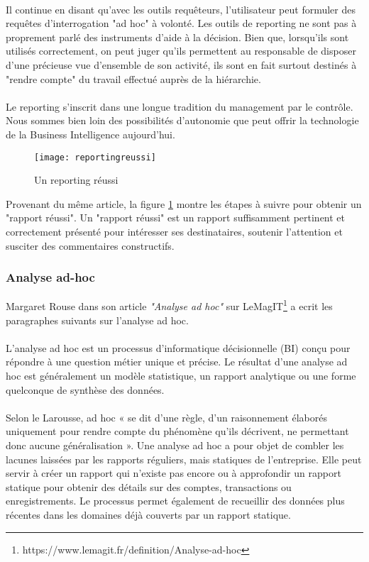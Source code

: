 \paragraph{}
Il continue en disant qu'avec les outils requêteurs, l'utilisateur peut formuler des requêtes d'interrogation "ad hoc" à volonté. Les outils de reporting ne sont pas à proprement parlé des instruments d'aide à la décision. Bien que, lorsqu'ils sont utilisés correctement, on peut juger qu'ils permettent au responsable de disposer d'une précieuse vue d'ensemble de son activité, ils sont en fait surtout destinés à "rendre compte" du travail effectué auprès de la hiérarchie. 
\paragraph{}
Le reporting s'inscrit dans une longue tradition du management par le contrôle. Nous sommes bien loin des possibilités d'autonomie que peut offrir la technologie de la Business Intelligence aujourd'hui.

\begin{figure}[H]
    \centering
    \texttt{[image: reportingreussi]}
    \caption{Un reporting réussi}
    \label{fig:reportingreussi}
\end{figure}

Provenant du même article, la figure \ref{fig:reportingreussi} montre les étapes à suivre pour obtenir un "rapport réussi". Un "rapport réussi" est un rapport suffisamment pertinent et correctement présenté pour intéresser ses destinataires, soutenir l'attention et susciter des commentaires constructifs.

\subsubsection{Analyse ad-hoc}
Margaret Rouse dans son article \textit{"Analyse ad hoc"} sur LeMagIT\footnote{https://www.lemagit.fr/definition/Analyse-ad-hoc} a ecrit les paragraphes suivants sur l'analyse ad hoc.
\paragraph{}
L'analyse ad hoc est un processus d'informatique décisionnelle (BI) conçu pour répondre à une question métier unique et précise. Le résultat d'une analyse ad hoc est généralement un modèle statistique, un rapport analytique ou une forme quelconque de synthèse des données. 
\paragraph{}
Selon le Larousse, ad hoc « se dit d'une règle, d'un raisonnement élaborés uniquement pour rendre compte du phénomène qu'ils décrivent, ne permettant donc aucune généralisation ». Une analyse ad hoc a pour objet de combler les lacunes laissées par les rapports réguliers, mais statiques de l'entreprise. Elle peut servir à créer un rapport qui n'existe pas encore ou à approfondir un rapport statique pour obtenir des détails sur des comptes, transactions ou enregistrements. Le processus permet également de recueillir des données plus récentes dans les domaines déjà couverts par un rapport statique.
